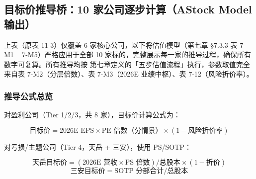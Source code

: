 \subsection{目标价推导桥：10 家公司逐步计算（AStock Model 输出）}

上表（原表 11-3）仅覆盖 6 家核心公司，以下将估值模型（第七章 §7.3.3 表 7-M1 ~ 7-M5）严格应用于全部 10 家标的，完整展示每一家的推导过程，确保所有数字可复算。所有推导均按 第七章定义的「五步估值流程」执行，参数取值完全来自表 7-M2（分层倍数）、表 7-M3（2026E 业绩中枢）、表 7-12（风险折价率）。

\subsubsection{推导公式总览}

对盈利公司（Tier 1/2/3，共 8 家），目标价计算公式为：

$$ \text{目标价} = \text{2026E EPS} \times \text{PE 倍数（分情景）} \times (1 - \text{风险折价率}) $$

对亏损/主题公司（Tier 4，天岳 + 三安），使用 PS/SOTP：

$$ \text{天岳目标价} = (\text{2026E 营收} \times \text{PS 倍数}) / \text{总股本} \times (1 - \text{折价}) $$
$$ \text{三安目标价} = \text{SOTP 分部合计} / \text{总股本} $$

